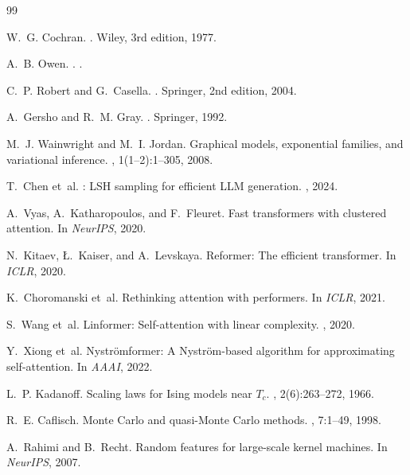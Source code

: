 \documentclass[11pt,a4paper]{article}
\theoremstyle{definition}
\begin{document}


\begin{thebibliography}{99}

W.~G. Cochran.
.
\newblock Wiley, 3rd edition, 1977.

A.~B. Owen.
.
.

C.~P. Robert and G.~Casella.
.
\newblock Springer, 2nd edition, 2004.

A.~Gersho and R.~M. Gray.
.
\newblock Springer, 1992.

M.~J. Wainwright and M.~I. Jordan.
\newblock Graphical models, exponential families, and variational inference.
, 1(1--2):1--305,
  2008.

T.~Chen et~al.
: {LSH} sampling for efficient {LLM} generation.
, 2024.

A.~Vyas, A.~Katharopoulos, and F.~Fleuret.
\newblock Fast transformers with clustered attention.
\newblock In {\em NeurIPS}, 2020.

N.~Kitaev, {\L}.~Kaiser, and A.~Levskaya.
\newblock Reformer: The efficient transformer.
\newblock In {\em ICLR}, 2020.

K.~Choromanski et~al.
\newblock Rethinking attention with performers.
\newblock In {\em ICLR}, 2021.

S.~Wang et~al.
\newblock Linformer: Self-attention with linear complexity.
, 2020.

Y.~Xiong et~al.
\newblock Nystr\"{o}mformer: A {Nystr\"{o}m}-based algorithm for
  approximating self-attention.
\newblock In {\em AAAI}, 2022.

L.~P. Kadanoff.
\newblock Scaling laws for {Ising} models near ${T}_c$.
, 2(6):263--272, 1966.

R.~E. Caflisch.
\newblock Monte {C}arlo and quasi-{M}onte {C}arlo methods.
, 7:1--49, 1998.

A.~Rahimi and B.~Recht.
\newblock Random features for large-scale kernel machines.
\newblock In {\em NeurIPS}, 2007.

\end{thebibliography}
\end{document}
